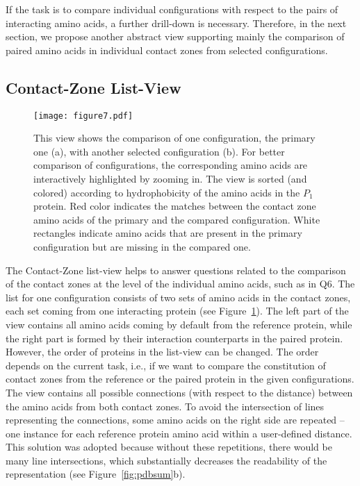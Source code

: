 \documentclass[twocolumn]{bmcart}%
\def\CoZoListView {Contact-Zone list-view\xspace}
\begin{document}
If the task is to compare individual configurations with respect to the pairs of interacting amino acids, a further drill-down is necessary.
Therefore, in the next section, we propose another abstract view supporting mainly the comparison of paired amino acids in individual contact zones from selected configurations.


\subsection*{Contact-Zone List-View}
\begin{figure}[tb]
    \centering
    \texttt{[image: figure7.pdf]}
   \caption{\csentence{\CoZoListView.} This view shows the comparison of one configuration, the primary one (a), with another selected configuration (b). For better comparison of configurations, the corresponding amino acids are interactively highlighted by zooming in. The view is sorted (and colored) according to hydrophobicity of the amino acids in the $P_1$ protein. Red color indicates the matches between the contact zone amino acids of the primary and the compared configuration. White rectangles indicate amino acids that are present in the primary configuration but are missing in the compared one.}
  \label{fig:list}
\end{figure}
The \CoZoListView helps to answer questions related to the comparison of the contact zones at the level of the individual amino acids, such as in Q6.
The list for one configuration consists of two sets of amino acids in the contact zones, each set coming from one interacting protein (see Figure~\ref{fig:list}).
The left part of the view contains all amino acids coming by default from the reference protein, while the right part is formed by their interaction counterparts in the paired protein.
However, the order of proteins in the list-view can be changed.
The order depends on the current task, i.e., if we want to compare the constitution of contact zones from the reference or the paired protein in the given configurations.
The view contains all possible connections (with respect to the distance) between the amino acids from both contact zones.
To avoid the intersection of lines representing the connections, some amino acids on the right side are repeated -- one instance for each reference protein amino acid within a user-defined distance. 
This solution was adopted because without these repetitions, there would be many line intersections, which substantially decreases the readability of the representation (see Figure~\ref{fig:pdbsum}b).
\end{document}

